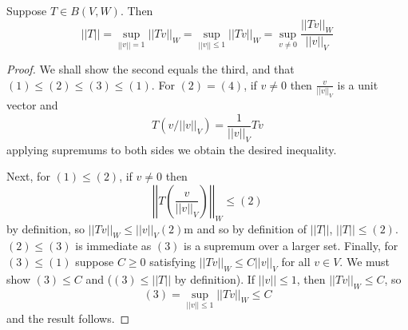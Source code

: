 \begin{proposition}
    Suppose $T \in B(V,W)$. Then $$||T|| = \sup_{||v|| = 1}||Tv||_W = \sup_{||v||\leq 1}||Tv||_W = \sup_{v\neq 0}\frac{||Tv||_W}{||v||_V}$$
\end{proposition}
\begin{proof}
    We shall show the second equals the third, and that $(1) \leq (2) \leq (3) \leq (1)$. For $(2) = (4)$, if $v \neq 0$ then $\frac{v}{||v||_V}$ is a unit vector and $$T(v/||v||_V) = \frac{1}{||v||_V}Tv$$ applying supremums to both sides we obtain the desired inequality. 

    Next, for $(1) \leq (2)$, if $v \neq 0$ then $$\left|\left|T\left(\frac{v}{||v||_V}\right)\right|\right|_W \leq (2)$$ by definition, so $||Tv||_W \leq ||v||_V(2)$m and so by definition of $||T||$, $||T|| \leq (2)$. $(2) \leq (3)$ is immediate as $(3)$ is a supremum over a larger set. Finally, for $(3) \leq (1)$ suppose $C \geq 0$ satisfying $||Tv||_W \leq C||v||_V$ for all $v \in V$. We must show $(3) \leq C$ and ($(3) \leq ||T||$ by definition). If $||v|| \leq 1$, then $||Tv||_W\leq C$, so $$(3) = \sup_{||v||\leq 1}||Tv||_W \leq C$$ and the result follows.
\end{proof}

